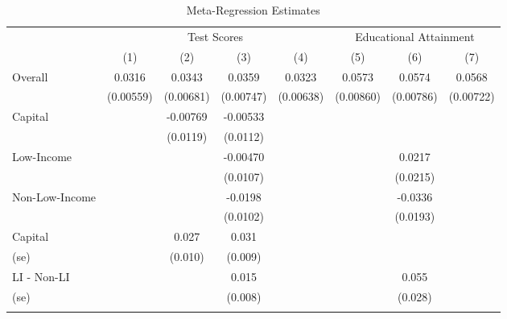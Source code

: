 \begin{table}[htbp]\centering
\caption{Meta-Regression Estimates \label{tab:MainPolicyRegs}}
\begin{tabular}{l*{7}{c}}
\hline\hline
                    &\multicolumn{4}{c}{Test Scores}                    &\multicolumn{3}{c}{Educational Attainment}\\\cmidrule(lr){2-5}\cmidrule(lr){6-8}
                    &\multicolumn{1}{c}{(1)}&\multicolumn{1}{c}{(2)}&\multicolumn{1}{c}{(3)}&\multicolumn{1}{c}{(4)}&\multicolumn{1}{c}{(5)}&\multicolumn{1}{c}{(6)}&\multicolumn{1}{c}{(7)}\\
\hline
Overall             &      0.0316&      0.0343&      0.0359&      0.0323&      0.0573&      0.0574&      0.0568\\
                    &   (0.00559)&   (0.00681)&   (0.00747)&   (0.00638)&   (0.00860)&   (0.00786)&   (0.00722)\\
Capital             &            &    -0.00769&    -0.00533&            &            &            &            \\
                    &            &    (0.0119)&    (0.0112)&            &            &            &            \\
Low-Income          &            &            &    -0.00470&            &            &      0.0217&            \\
                    &            &            &    (0.0107)&            &            &    (0.0215)&            \\
Non-Low-Income      &            &            &     -0.0198&            &            &     -0.0336&            \\
                    &            &            &    (0.0102)&            &            &    (0.0193)&            \\
\hline
Capital             &            &       0.027&       0.031&            &            &            &            \\
(se)                &            &     (0.010)&     (0.009)&            &            &            &            \\
LI - Non-LI         &            &            &       0.015&            &            &       0.055&            \\
(se)                &            &            &     (0.008)&            &            &     (0.028)&            \\
\hline              &            &            &            &            &            &            &            \\

\end{tabular}
\end{table}
